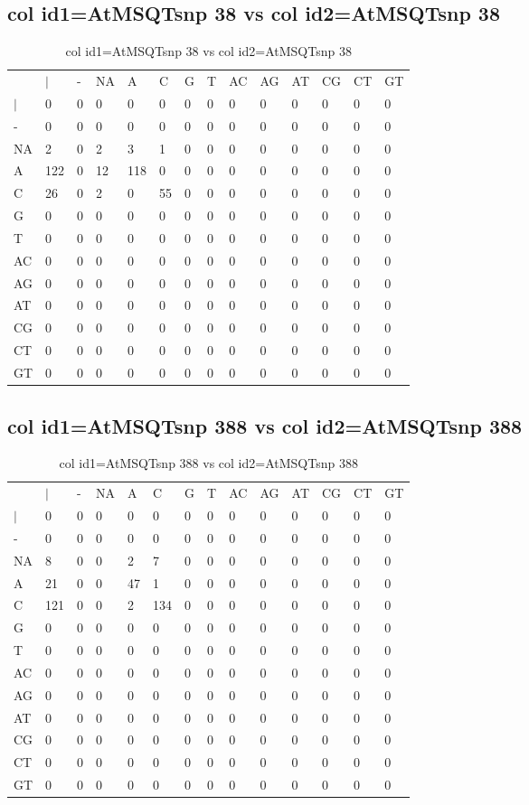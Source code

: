 \subsection{col id1=AtMSQTsnp 38 vs col id2=AtMSQTsnp 38}
\begin{center}
\begin{longtable}{|l|l|l|l|l|l|l|l|l|l|l|l|l|l|}
\caption{col id1=AtMSQTsnp 38 vs col id2=AtMSQTsnp 38} \label{table_dm898}\\
\hline
\\
\hline
&$|$&-&NA&A&C&G&T&AC&AG&AT&CG&CT&GT\\
$|$&0&0&0&0&0&0&0&0&0&0&0&0&0\\
-&0&0&0&0&0&0&0&0&0&0&0&0&0\\
NA&2&0&2&3&1&0&0&0&0&0&0&0&0\\
A&122&0&12&118&0&0&0&0&0&0&0&0&0\\
C&26&0&2&0&55&0&0&0&0&0&0&0&0\\
G&0&0&0&0&0&0&0&0&0&0&0&0&0\\
T&0&0&0&0&0&0&0&0&0&0&0&0&0\\
AC&0&0&0&0&0&0&0&0&0&0&0&0&0\\
AG&0&0&0&0&0&0&0&0&0&0&0&0&0\\
AT&0&0&0&0&0&0&0&0&0&0&0&0&0\\
CG&0&0&0&0&0&0&0&0&0&0&0&0&0\\
CT&0&0&0&0&0&0&0&0&0&0&0&0&0\\
GT&0&0&0&0&0&0&0&0&0&0&0&0&0\\
\hline
\end{longtable}
\end{center}

\subsection{col id1=AtMSQTsnp 388 vs col id2=AtMSQTsnp 388}
\begin{center}
\begin{longtable}{|l|l|l|l|l|l|l|l|l|l|l|l|l|l|}
\caption{col id1=AtMSQTsnp 388 vs col id2=AtMSQTsnp 388} \label{table_dm900}\\
\hline
\\
\hline
&$|$&-&NA&A&C&G&T&AC&AG&AT&CG&CT&GT\\
$|$&0&0&0&0&0&0&0&0&0&0&0&0&0\\
-&0&0&0&0&0&0&0&0&0&0&0&0&0\\
NA&8&0&0&2&7&0&0&0&0&0&0&0&0\\
A&21&0&0&47&1&0&0&0&0&0&0&0&0\\
C&121&0&0&2&134&0&0&0&0&0&0&0&0\\
G&0&0&0&0&0&0&0&0&0&0&0&0&0\\
T&0&0&0&0&0&0&0&0&0&0&0&0&0\\
AC&0&0&0&0&0&0&0&0&0&0&0&0&0\\
AG&0&0&0&0&0&0&0&0&0&0&0&0&0\\
AT&0&0&0&0&0&0&0&0&0&0&0&0&0\\
CG&0&0&0&0&0&0&0&0&0&0&0&0&0\\
CT&0&0&0&0&0&0&0&0&0&0&0&0&0\\
GT&0&0&0&0&0&0&0&0&0&0&0&0&0\\
\hline
\end{longtable}
\end{center}

